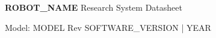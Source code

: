 \documentclass[a4paper,landscape,10pt]{article}
\begin{document}
\noindent
\colorbox{maincolor}{
    \parbox{\dimexpr\linewidth-2\fboxsep}{
        \vspace{8pt}
        
        {\color{white}\Large\textbf{{{ROBOT_NAME}}}} \hfill
        {\color{white}\small Research System Datasheet}
        
        \vspace{2pt}
        
        {\color{white}\small Model: {{MODEL}}} \hfill
        {\color{white}\small Rev {{SOFTWARE_VERSION}} | {{YEAR}}}
        
        \vspace{8pt}
    }
}
\vspace{0.4cm}
\end{document}
